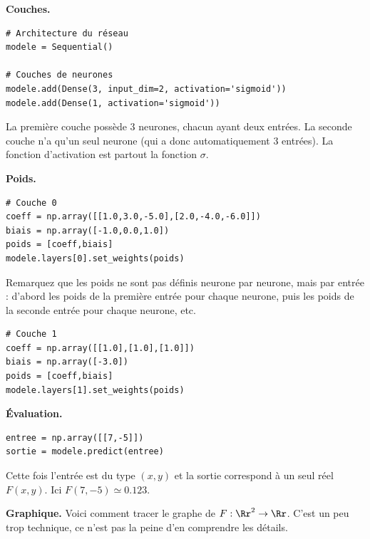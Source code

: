 \documentclass[11pt,class=report,crop=false]{standalone}
\begin{document}
\textbf{Couches.}
\begin{lstlisting}
# Architecture du réseau
modele = Sequential()

# Couches de neurones
modele.add(Dense(3, input_dim=2, activation='sigmoid'))
modele.add(Dense(1, activation='sigmoid'))
\end{lstlisting}

La première couche possède $3$ neurones, chacun ayant deux entrées.
La seconde couche n'a qu'un seul neurone (qui a donc automatiquement $3$ entrées). La fonction d'activation est partout la fonction $\sigma$.

\bigskip
\textbf{Poids.}


\begin{lstlisting}
# Couche 0
coeff = np.array([[1.0,3.0,-5.0],[2.0,-4.0,-6.0]])
biais = np.array([-1.0,0.0,1.0])
poids = [coeff,biais]
modele.layers[0].set_weights(poids)
\end{lstlisting}

Remarquez que les poids ne sont pas définis neurone par neurone, mais par entrée : d'abord les poids de la première entrée pour chaque neurone, puis les poids de la seconde entrée pour chaque neurone, etc.

\begin{lstlisting}
# Couche 1
coeff = np.array([[1.0],[1.0],[1.0]])
biais = np.array([-3.0])
poids = [coeff,biais]
modele.layers[1].set_weights(poids)
\end{lstlisting}

\bigskip
\textbf{Évaluation.}
\begin{lstlisting}
entree = np.array([[7,-5]])
sortie = modele.predict(entree)
\end{lstlisting}

Cette fois l'entrée est du type $(x,y)$ et la sortie correspond à un seul réel $F(x,y)$. Ici $F(7,-5) \simeq 0.123$.

\bigskip
\textbf{Graphique.}
Voici comment tracer le graphe de $F: \Rr^2 \to \Rr$. C'est un peu trop technique, ce n'est pas la peine d'en comprendre les détails.
\end{document}
